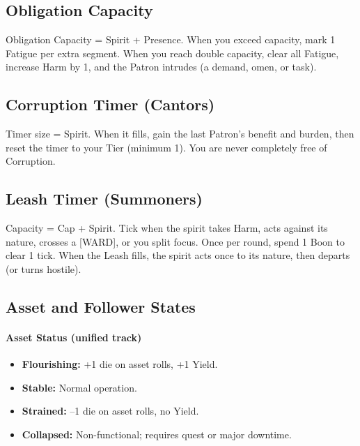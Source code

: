 \subsection{Obligation Capacity}\label{subsec:obligation_capacity}

Obligation Capacity = Spirit + Presence. When you exceed capacity, mark 1 Fatigue
per extra segment. When you reach double capacity, clear all Fatigue, increase
Harm by 1, and the Patron intrudes (a demand, omen, or task).

\subsection{Corruption Timer (Cantors)}\label{subsec:corruption_timer}

Timer size = Spirit. When it fills, gain the last Patron's benefit and burden,
then reset the timer to your Tier (minimum 1). You are never completely free of
Corruption.

\subsection{Leash Timer (Summoners)}\label{subsec:leash_timer}

Capacity = Cap + Spirit. Tick when the spirit takes Harm, acts against its
nature, crosses a [WARD], or you split focus. Once per round, spend 1 Boon to
clear 1 tick. When the Leash fills, the spirit acts once to its nature, then
departs (or turns hostile).

\subsection{Asset and Follower States}\label{subsec:asset_follower_states}

\paragraph{Asset Status (unified track)}
\begin{itemize}
    \item \textbf{Flourishing:} +1 die on asset rolls, +1 Yield.
    \item \textbf{Stable:} Normal operation.
    \item \textbf{Strained:} --1 die on asset rolls, no Yield.
    \item \textbf{Collapsed:} Non-functional; requires quest or major downtime.
\end{itemize}

